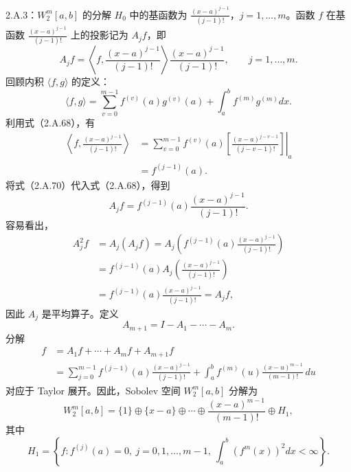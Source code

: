 \begin{bookexample}{2.A.3：$W_2^m[a,b]$ 的分解}
$H_0$ 中的基函数为 $\frac{(x-a)^{j-1}}{(j-1)!}$，$j=1,\ldots,m$。函数 $f$ 在基函数 $\frac{(x-a)^{j-1}}{(j-1)!}$ 上的投影记为 $A_jf$，即
\begin{equation}
A_jf=\left\langle f,\frac{(x-a)^{j-1}}{(j-1)!}\right\rangle
 \frac{(x-a)^{j-1}}{(j-1)!},
\qquad j=1,\ldots,m.\tag{2.A.68}
\end{equation}
回顾内积 $\langle f,g\rangle$ 的定义：
\begin{equation}
\langle f,g\rangle
 =\sum_{v=0}^{m-1}f^{(v)}(a)g^{(v)}(a)
  +\int_a^bf^{(m)}g^{(m)}dx.\tag{2.A.69}
\end{equation}
利用式（2.A.68），有
\begin{equation}
\begin{aligned}
\left\langle f,\frac{(x-a)^{j-1}}{(j-1)!}\right\rangle
 &=\left.\sum_{v=0}^{m-1}f^{(v)}(a)
   \left[\frac{(x-a)^{j-v-1}}{(j-v-1)!}\right]\right|_a\\
 &=f^{(j-1)}(a).
\end{aligned}\tag{2.A.70}
\end{equation}
将式（2.A.70）代入式（2.A.68），得到
\begin{equation}
A_jf=f^{(j-1)}(a)\frac{(x-a)^{j-1}}{(j-1)!}.\tag{2.A.71}
\end{equation}
容易看出，
\[
\begin{aligned}
A_j^2f&=A_j(A_jf)
 =A_j\left(f^{(j-1)}(a)\frac{(x-a)^{j-1}}{(j-1)!}\right)\\
 &=f^{(j-1)}(a)A_j\left(\frac{(x-a)^{j-1}}{(j-1)!}\right)\\
 &=f^{(j-1)}(a)\frac{(x-a)^{j-1}}{(j-1)!}=A_jf,
\end{aligned}
\]
因此 $A_j$ 是平均算子。定义
\[
A_{m+1}=I-A_1-\cdots-A_m.
\]
分解
\[
\begin{aligned}
f&=A_1f+\cdots+A_mf+A_{m+1}f\\
 &=\sum_{j=0}^{m-1}f^{(j-1)}(a)\frac{(x-a)^{j-1}}{(j-1)!}
   +\int_a^bf^{(m)}(u)\frac{(x-u)^{m-1}}{(m-1)!}\,du
\end{aligned}
\]
对应于 Taylor 展开。因此，Sobolev 空间 $W_2^m[a,b]$ 分解为
\begin{equation}
W_2^m[a,b]=\{1\}\oplus\{x-a\}\oplus\cdots
 \oplus\frac{(x-a)^{m-1}}{(m-1)!}\oplus H_1,\tag{2.A.72}
\end{equation}
其中
\[
H_1=\left\{f:f^{(j)}(a)=0,\ j=0,1,\ldots,m-1,\
            \int_a^b(f^m(x))^2dx<\infty\right\}.
\]
\end{bookexample}

